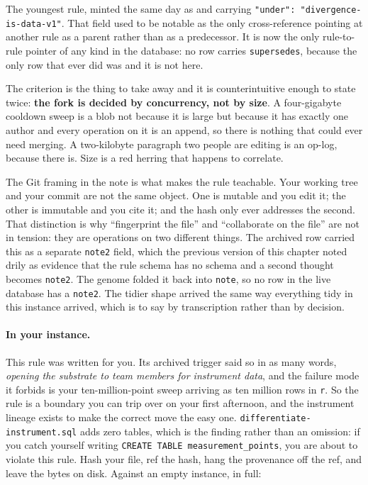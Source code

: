 The youngest rule, minted the same day as  and carrying \texttt{"under": "divergence-is-data-v1"}. That field used to be notable as the only cross-reference pointing at another rule as a parent rather than as a predecessor. It is now the only rule-to-rule pointer of any kind in the database: no row carries \texttt{supersedes}, because the only row that ever did was  and it is not here.

The criterion is the thing to take away and it is counterintuitive enough to state twice: \textbf{the fork is decided by concurrency, not by size}. A four-gigabyte \labColdSystemColloquial{} cooldown sweep is a blob not because it is large but because it has exactly one author and every operation on it is an append, so there is nothing that could ever need merging. A two-kilobyte paragraph two people are editing is an op-log, because there is. Size is a red herring that happens to correlate.

The Git framing in the note is what makes the rule teachable. Your working tree and your commit are not the same object. One is mutable and you edit it; the other is immutable and you cite it; and the hash only ever addresses the second. That distinction is why ``fingerprint the file'' and ``collaborate on the file'' are not in tension: they are operations on two different things. The archived row carried this as a separate \texttt{note2} field, which the previous version of this chapter noted drily as evidence that the rule schema has no schema and a second thought becomes \texttt{note2}. The genome folded it back into \texttt{note}, so no row in the live database has a \texttt{note2}. The tidier shape arrived the same way everything tidy in this instance arrived, which is to say by transcription rather than by decision.

\paragraph{In your instance.} This rule was written for you. Its archived trigger said so in as many words, \emph{opening the substrate to team members for instrument data}, and the failure mode it forbids is your ten-million-point sweep arriving as ten million rows in \texttt{r}. So the rule is a boundary you can trip over on your first afternoon, and the instrument lineage exists to make the correct move the easy one. \texttt{differentiate-instrument.sql} adds zero tables, which is the finding rather than an omission: if you catch yourself writing \texttt{CREATE TABLE measurement\_points}, you are about to violate this rule. Hash your \labFileFormat{} file, ref the hash, hang the provenance off the ref, and leave the bytes on disk. Against an empty instance, in full:

